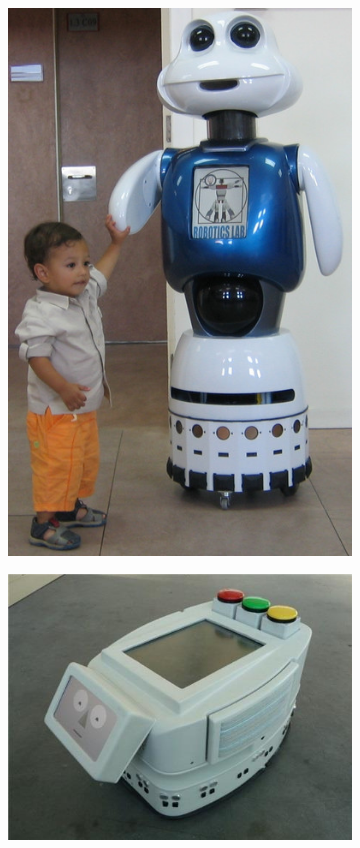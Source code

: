 \documentclass[a4paper,twoside]{book}
\begin{document}
\begin{figure}[h]
\begin{subfigure}[b]{0.3\textwidth}
    \includegraphics[width=1\linewidth]{img/Salichs}
  \end{subfigure}%
  \quad%
  \begin{subfigure}[b]{0.3\textwidth}
    \includegraphics[width=1\linewidth]{img/Heuvel}

\end{subfigure}
\end{figure}
\end{document}
